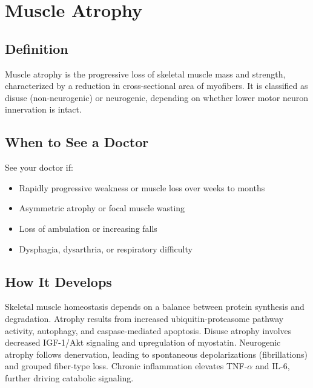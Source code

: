 \chapter{Muscle Atrophy}

\section*{Definition}
Muscle atrophy is the progressive loss of skeletal muscle mass and strength, characterized by a reduction in cross-sectional area of myofibers. It is classified as disuse (non-neurogenic) or neurogenic, depending on whether lower motor neuron innervation is intact.

\section*{When to See a Doctor}
See your doctor if:
\begin{itemize}
  \item Rapidly progressive weakness or muscle loss over weeks to months
  \item Asymmetric atrophy or focal muscle wasting
  \item Loss of ambulation or increasing falls
  \item Dysphagia, dysarthria, or respiratory difficulty
\end{itemize}

\section*{How It Develops}
Skeletal muscle homeostasis depends on a balance between protein synthesis and degradation. Atrophy results from increased ubiquitin-proteasome pathway activity, autophagy, and caspase-mediated apoptosis. Disuse atrophy involves decreased IGF-1/Akt signaling and upregulation of myostatin. Neurogenic atrophy follows denervation, leading to spontaneous depolarizations (fibrillations) and grouped fiber-type loss. Chronic inflammation elevates TNF-$\alpha$ and IL-6, further driving catabolic signaling.

